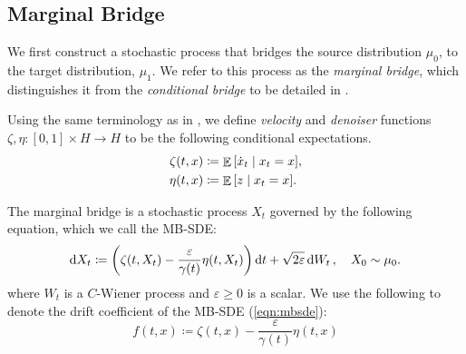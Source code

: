 
\subsection{Marginal Bridge}
We first construct a stochastic process that bridges the source distribution \(\mu_{0}\), to the target distribution, \(\mu_{1}\). We refer to this process as the \textit{marginal bridge}, which distinguishes it from the \textit{conditional bridge} to be detailed in .

Using the same terminology as in \citet{albergo2023stochasticinterpolantsunifyingframework}, we define \textit{velocity} and \textit{denoiser} functions \(\zeta, \eta: [0, 1] \times H \to H\) to be the following conditional expectations. %
\begin{align}
  \zeta(t, x) &\coloneqq \mathop{\mathbb{E}}\qty[ \dot{x}_{t} \mid x_{t} = x], \label{eqn:zetadef} \\
  \eta(t, x) &\coloneqq \mathop{\mathbb{E}}\qty[z \mid x_{t} = x]. \label{eqn:etadef}
\end{align}

The marginal bridge is a stochastic process \(X_{t}\) governed by the following equation, which we call the MB-SDE:
\begin{equation}
  \dd{X_{t}} \coloneqq \qty(\zeta(t, X_{t}) - \frac{\varepsilon}{\gamma(t)} \eta(t, X_{t}))\dd{t} + \sqrt{2\varepsilon} \dd{W_{t}}, \quad X_{0} \sim \mu_{0}. \label{eqn:mbsde}
\end{equation}
where \(W_{t}\) is a \(C\)-Wiener process and \(\varepsilon \geq 0\) is a scalar. We use the following to denote the drift coefficient of the MB-SDE (\ref{eqn:mbsde}):
\begin{equation}
  f(t, x) \coloneqq \zeta(t, x) - \frac{\varepsilon}{\gamma(t)} \eta(t, x)  \label{eqn:deff} %
\end{equation}


